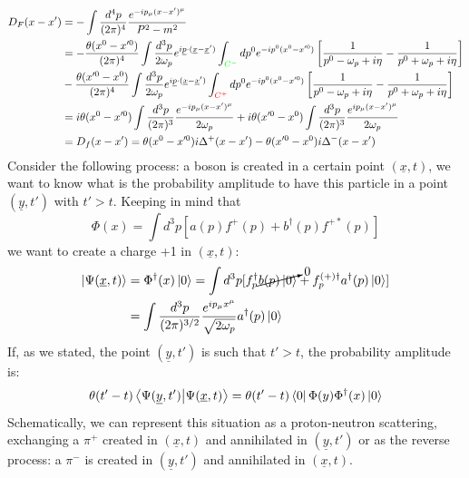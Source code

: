 \documentclass[../main.tex]{subfiles}
\begin{document}
\begin{align*}
D_F(x-x')&=-\int\frac{d^4p}{(2\pi)^4}\frac{e^{-ip_\mu(x-x')^\mu}}{P^2-m^2}\\
&=-\frac{\theta(x^0-x'^0)}{(2\pi)^4}\int\frac{d^3p}{2\omega_p}e^{i\underline{p}\cdot(\underline{x}-\underline{x}')}\int_{{\color{green}C^-}} dp^0e^{-ip^0(x^0-x'^0)}\left[\frac{1}{p^0-\omega_p+i\eta}-\frac{1}{p^0+\omega_p+i\eta}\right]\\
&-\frac{\theta(x'^0-x^0)}{(2\pi)^4}\int\frac{d^3p}{2\omega_p}e^{i\underline{p}\cdot(\underline{x}-\underline{x}')}\int_{{\color{red}C^+}} dp^0e^{-ip^0(x^0-x'^0)}\left[\frac{1}{p^0-\omega_p+i\eta}-\frac{1}{p^0+\omega_p+i\eta}\right]\\
&=i\theta(x^0-x'^0)\int\frac{d^3p}{(2\pi)^3}\frac{e^{-ip_\mu(x-x')^\mu}}{2\omega_p}+i\theta(x'^0-x^0)\int\frac{d^3p}{(2\pi)^3}\frac{e^{ip_\mu(x-x')^\mu}}{2\omega_p}\\
&=D_f(x-x')=\theta(x^0-x'^0)i\Delta^+(x-x')-\theta(x'^0-x^0)i\Delta^-(x-x')
\end{align*}
Consider the following process: a boson is created in a certain point $(\underline{x},t)$, we want to know what is the probability amplitude to have this particle in a point $(\underline{y},t')$ with $t'>t$. Keeping in mind that 
\[
\Phi(x)=\int d^3p[a(p)f^+(p)+b^\dagger(p)f^{+*}(p)]
\]
we want to create a charge +1 in $(\underline{x},t)$:
\begin{align*}
\ket{\Psi(\underline{x},t)}&=\Phi^\dagger(x)\ket{0}=\int d^3p[f_p^\dagger \cancelto{0}{b(p)\ket{0}}+f_p^{(+)\dagger}a^\dagger(p)\ket{0}]\\
&=\int \frac{d^3p}{(2\pi)^{3/2}}\frac{e^{ip_\mu x^\mu}}{\sqrt{2\omega_p}}a^\dagger(p)\ket{0}
\end{align*}
If, as we stated, the point $(\underline{y},t')$ is such that $t'>t$, the probability amplitude is:
\[
\theta(t'-t)\bra{\Psi(\underline{y},t')}\ket{\Psi(\underline{x},t)}=\theta(t'-t)\bra{0}\Phi(y)\Phi^\dagger(x)\ket{0}
\]
Schematically, we can represent this situation as a proton-neutron scattering, exchanging a $\pi^+$ created in $(\underline{x},t)$ and annihilated in $(\underline{y},t')$ or as the reverse process: a $\pi^-$ is created in $(\underline{y},t')$ and annihilated in $(\underline{x},t)$.
\begin{center}
\end{center}
\end{document}
